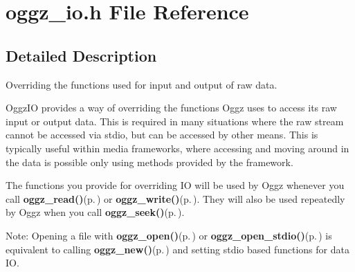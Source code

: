 \section{oggz\_\-io.h File Reference}
\label{oggz__io_8h}


\subsection{Detailed Description}
Overriding the functions used for input and output of raw data. 

Oggz\-IO provides a way of overriding the functions Oggz uses to access its raw input or output data. This is required in many situations where the raw stream cannot be accessed via stdio, but can be accessed by other means. This is typically useful within media frameworks, where accessing and moving around in the data is possible only using methods provided by the framework.

The functions you provide for overriding IO will be used by Oggz whenever you call {\bf oggz\_\-read()}{\rm (p.\,\pageref{group__read__api_ga2})} or {\bf oggz\_\-write()}{\rm (p.\,\pageref{group__write__api_ga4})}. They will also be used repeatedly by Oggz when you call {\bf oggz\_\-seek()}{\rm (p.\,\pageref{group__seek__api_ga8})}.

\begin{Desc}
\item[Note:]Opening a file with {\bf oggz\_\-open()}{\rm (p.\,\pageref{oggz_8h_a5})} or {\bf oggz\_\-open\_\-stdio()}{\rm (p.\,\pageref{oggz_8h_a6})} is equivalent to calling {\bf oggz\_\-new()}{\rm (p.\,\pageref{oggz_8h_a4})} and setting stdio based functions for data IO.\end{Desc}


